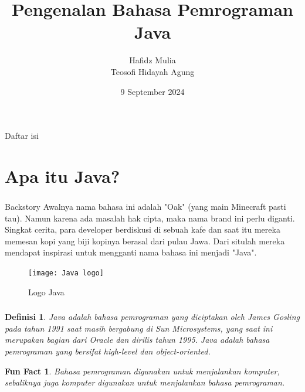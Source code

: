 \documentclass[aspectratio=169]{beamer}
\author[Tew \& Haf]{Hafidz Mulia\\Teosofi Hidayah Agung}
\date{9 September 2024}
\title[Alpro 1 - Week 1]{Pengenalan Bahasa Pemrograman Java}
\institute[Matematika ITS]{Departemen Matematika\\ Institut Teknologi Sepuluh Nopember}
\newtheorem*{funfact}{Fun Fact}
\newtheorem*{definisi}{Definisi}
\theoremstyle{definition}
\begin{document}
    {
    \begin{frame}
        \titlepage
    \end{frame}
    }

    {
    \begin{frame}{Daftar isi}
        \tableofcontents
    \end{frame}
    }

    \section{Apa itu Java?}
    \begin{frame}
        \frametitle{\insertsection}
        \begin{block}{Backstory}
            Awalnya nama bahasa ini adalah "Oak" (yang main Minecraft pasti tau). Namun karena ada masalah hak cipta, maka nama brand ini perlu diganti. Singkat cerita, para developer berdiskusi di sebuah kafe dan saat itu mereka memesan kopi yang biji kopinya berasal dari pulau Jawa. Dari situlah mereka mendapat inspirasi untuk mengganti nama bahasa ini menjadi "Java".
        \end{block}
        \begin{figure}[h!]
            \centering
            \texttt{[image: Java logo]}
            \caption{Logo Java}
        \end{figure}
    \end{frame}

    \begin{frame}
        \frametitle{\insertsection}
        \begin{definisi}
            Java adalah bahasa pemrograman yang diciptakan oleh James Gosling pada tahun 1991 saat masih bergabung di Sun Microsystems, yang saat ini merupakan bagian dari Oracle dan dirilis tahun 1995. Java adalah bahasa pemrograman yang bersifat \textit{high-level} dan \textit{object-oriented}. 
        \end{definisi}
        \begin{funfact}
            Bahasa pemrograman digunakan untuk menjalankan komputer, sebaliknya juga komputer digunakan untuk menjalankan bahasa pemrograman.\\~\\

        \end{funfact}
    \end{frame}
\end{document}
